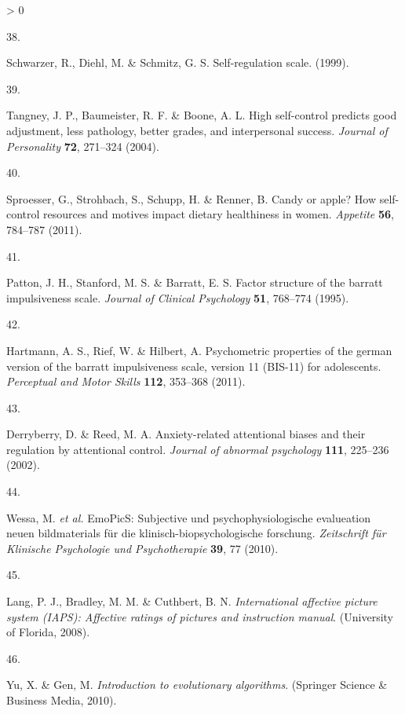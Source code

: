 \documentclass[
  english,
  man,floatsintext]{apa6}
\newlength{\cslhangindent}
\newlength{\csllabelwidth}
\newenvironment{CSLReferences}[2] %
 {%
  \setlength{\parindent}{0pt}
  \ifodd #1 \everypar{\setlength{\hangindent}{\cslhangindent}}\ignorespaces\fi
  \ifnum #2 > 0
  \setlength{\parskip}{#2\baselineskip}
  \fi
 }%
 {}
\newcommand{\CSLLeftMargin}[1]{\parbox[t]{\csllabelwidth}{#1}}
\newcommand{\CSLRightInline}[1]{\parbox[t]{\linewidth - \csllabelwidth}{#1}\break}
\begin{document}
\begin{CSLReferences}{0}{0}
\leavevmode\hypertarget{ref-Schwarzer1999}{}%
\CSLLeftMargin{38. }
\CSLRightInline{Schwarzer, R., Diehl, M. \& Schmitz, G. S. Self-regulation scale. (1999).}

\leavevmode\hypertarget{ref-Tangney2004}{}%
\CSLLeftMargin{39. }
\CSLRightInline{Tangney, J. P., Baumeister, R. F. \& Boone, A. L. High self-control predicts good adjustment, less pathology, better grades, and interpersonal success. \emph{Journal of Personality} \textbf{72}, 271--324 (2004).}

\leavevmode\hypertarget{ref-Sproesser2011}{}%
\CSLLeftMargin{40. }
\CSLRightInline{Sproesser, G., Strohbach, S., Schupp, H. \& Renner, B. Candy or apple? How self-control resources and motives impact dietary healthiness in women. \emph{Appetite} \textbf{56}, 784--787 (2011).}

\leavevmode\hypertarget{ref-Patton1995}{}%
\CSLLeftMargin{41. }
\CSLRightInline{Patton, J. H., Stanford, M. S. \& Barratt, E. S. Factor structure of the barratt impulsiveness scale. \emph{Journal of Clinical Psychology} \textbf{51}, 768--774 (1995).}

\leavevmode\hypertarget{ref-Hartmann2011}{}%
\CSLLeftMargin{42. }
\CSLRightInline{Hartmann, A. S., Rief, W. \& Hilbert, A. Psychometric properties of the german version of the barratt impulsiveness scale, version 11 (BIS-11) for adolescents. \emph{Perceptual and Motor Skills} \textbf{112}, 353--368 (2011).}

\leavevmode\hypertarget{ref-Derryberry2002}{}%
\CSLLeftMargin{43. }
\CSLRightInline{Derryberry, D. \& Reed, M. A. Anxiety-related attentional biases and their regulation by attentional control. \emph{Journal of abnormal psychology} \textbf{111}, 225--236 (2002).}

\leavevmode\hypertarget{ref-Wessa2010}{}%
\CSLLeftMargin{44. }
\CSLRightInline{Wessa, M. \emph{et al.} EmoPicS: Subjective und psychophysiologische evalueation neuen bildmaterials für die klinisch-biopsychologische forschung. \emph{Zeitschrift für Klinische Psychologie und Psychotherapie} \textbf{39}, 77 (2010).}

\leavevmode\hypertarget{ref-Lang2008}{}%
\CSLLeftMargin{45. }
\CSLRightInline{Lang, P. J., Bradley, M. M. \& Cuthbert, B. N. \emph{International affective picture system (IAPS): Affective ratings of pictures and instruction manual}. (University of Florida, 2008).}

\leavevmode\hypertarget{ref-Yu2010}{}%
\CSLLeftMargin{46. }
\CSLRightInline{Yu, X. \& Gen, M. \emph{Introduction to evolutionary algorithms}. (Springer Science \& Business Media, 2010).}


\end{CSLReferences}
\end{document}
